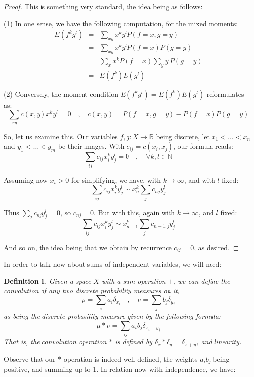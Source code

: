\documentclass[12pt]{amsbook}
\newtheorem{definition}[theorem]{Definition}
\begin{document}
\begin{proof}
This is something very standard, the idea being as follows:

\medskip

(1) In one sense, we have the following computation, for the mixed moments:
\begin{eqnarray*}
E(f^kg^l)
&=&\sum_{xy}x^ky^lP(f=x,g=y)\\
&=&\sum_{xy}x^ky^lP(f=x)P(g=y)\\
&=&\sum_xx^kP(f=x)\sum_yy^lP(g=y)\\
&=&E(f^k)E(g^l)
\end{eqnarray*}

(2) Conversely, the moment condition $E(f^kg^l)=E(f^k)E(g^l)$ reformulates as:
$$\sum_{xy}c(x,y)x^ky^l=0\quad,\quad 
c(x,y)=P(f=x,g=y)-P(f=x)P(g=y)$$

So, let us examine this. Our variables $f,g:X\to\mathbb R$ being discrete, let $x_1<\ldots<x_n$ and $y_1<\ldots<y_m$ be their images. With $c_{ij}=c(x_i,x_j)$, our formula reads:
$$\sum_{ij}c_{ij}x_i^ky_j^l=0\quad,\quad\forall k,l\in\mathbb N$$

Assuming now $x_i>0$ for simplifying, we have, with $k\to\infty$, and with $l$ fixed:
$$\sum_{ij}c_{ij}x_i^ky_j^l\sim x_n^k\sum_jc_{nj}y_j^l$$

Thus $\sum_jc_{nj}y_j^l=0$, so $c_{nj}=0$. But with this, again with $k\to\infty$, and $l$ fixed:
$$\sum_{ij}c_{ij}x_i^ky_j^l\sim x_{n-1}^k\sum_jc_{n-1,j}y_j^l$$

And so on, the idea being that we obtain by recurrence $c_{ij}=0$, as desired.
\end{proof}

In order to talk now about sums of independent variables, we will need:


\begin{definition}
Given a space $X$ with a sum operation $+$, we can define the convolution of any two discrete probability measures on it,
$$\mu=\sum_ia_i\delta_{x_i}\quad,\quad \nu=\sum_jb_j\delta_{y_j}$$
as being the discrete probability measure given by the following formula:
$$\mu*\nu=\sum_{ij}a_ib_j\delta_{x_i+y_j}$$
That is, the convolution operation $*$ is defined by $\delta_x*\delta_y=\delta_{x+y}$, and linearity.
\end{definition}

Observe that our $*$ operation is indeed well-defined, the weights $a_ib_j$ being positive, and summing up to 1. In relation now with independence, we have:
\end{document}
